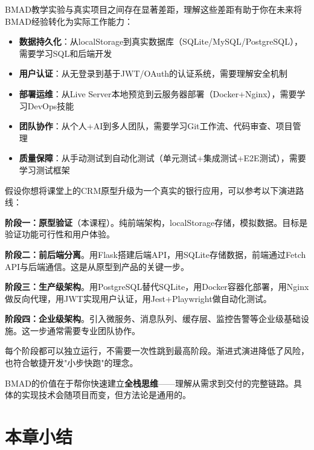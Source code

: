 BMAD教学实验与真实项目之间存在显著差距，理解这些差距有助于你在未来将BMAD经验转化为实际工作能力：\par

\begin{itemize}[leftmargin=2em]
  \item \textbf{数据持久化}：从localStorage到真实数据库（SQLite/MySQL/PostgreSQL），需要学习SQL和后端开发
  \item \textbf{用户认证}：从无登录到基于JWT/OAuth的认证系统，需要理解安全机制
  \item \textbf{部署运维}：从Live Server本地预览到云服务器部署（Docker+Nginx），需要学习DevOps技能
  \item \textbf{团队协作}：从个人+AI到多人团队，需要学习Git工作流、代码审查、项目管理
  \item \textbf{质量保障}：从手动测试到自动化测试（单元测试+集成测试+E2E测试），需要学习测试框架
\end{itemize}\par

\begin{casebox}[从BMAD原型到生产系统的演进路线]
假设你想将课堂上的CRM原型升级为一个真实的银行应用，可以参考以下演进路线：\par

\textbf{阶段一：原型验证}（本课程）。纯前端架构，localStorage存储，模拟数据。目标是验证功能可行性和用户体验。\par

\textbf{阶段二：前后端分离}。用Flask搭建后端API，用SQLite存储数据，前端通过Fetch API与后端通信。这是从原型到产品的关键一步。\par

\textbf{阶段三：生产级架构}。用PostgreSQL替代SQLite，用Docker容器化部署，用Nginx做反向代理，用JWT实现用户认证，用Jest+Playwright做自动化测试。\par

\textbf{阶段四：企业级架构}。引入微服务、消息队列、缓存层、监控告警等企业级基础设施。这一步通常需要专业团队协作。\par

每个阶段都可以独立运行，不需要一次性跳到最高阶段。渐进式演进降低了风险，也符合敏捷开发"小步快跑"的理念。\end{casebox}

BMAD的价值在于帮你快速建立\textbf{全栈思维}——理解从需求到交付的完整链路。具体的实现技术会随项目而变，但方法论是通用的。

\section{本章小结}

